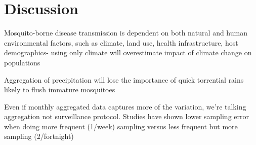 \section{Discussion}

Mosquito-borne disease transmission is dependent on both natural and human environmental factors, such as climate, land use, health infrastructure, host demographics- using only climate will overestimate impact of climate change on populations \citep{Parham2015}

Aggregation of precipitation will lose the importance of quick torrential rains likely to flush immature mosquitoes \citep{Koenraadt2008}

Even if monthly aggregated data captures more of the variation, we're talking aggregation not surveillance protocol. Studies have shown lower sampling error when doing more frequent (1/week) sampling versus less frequent but more sampling (2/fortnight) \citep{MagbityLines2002}


